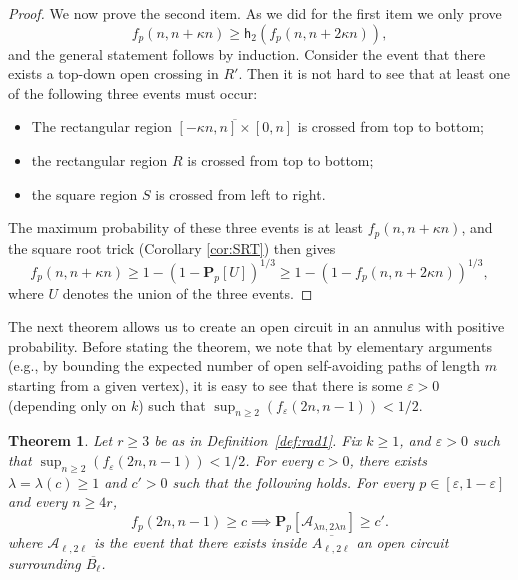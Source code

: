 \documentclass[12pt, twoside,a4paper,reqno]{amsart}
\theoremstyle{plain}
\newtheorem{theorem}{Theorem}[section]
\theoremstyle{remark}
\theoremstyle{definition}
\newcommand{\eps}{\varepsilon}
\newcommand{\PP}{\mathbf{P}}
\newcommand{\Pp}[1]{\PP_p \left [ #1 \right ]}
\newcommand{\ol}{\overline}
\begin{document}
\begin{proof}
We now prove the second item. As we did for the first item we only prove
\begin{equation}
  \label{eq:44}
  f_p(n,n +\kappa n)\geq \mathsf{h}_{2}(f_p(n,n+2\kappa n)),
\end{equation}
and the general statement follows by induction. Consider the event that
there exists a top-down open crossing in $R'$. Then it is not hard to see that at least one of the following three
events must occur:
\begin{itemize}
\item The rectangular region $\ol{[-\kappa n,n]\times[0,n]}$ is crossed from top to bottom;
\item the rectangular region $R$ is crossed from top to bottom;
\item the square region $S$ is crossed from left to right.
\end{itemize}
The maximum probability of these three events is at least $f_p(n,n+\kappa n)$,
and the square root trick (Corollary \ref{cor:SRT}) then gives
\begin{equation}
  \label{eq:45}
  f_p(n,n+\kappa n)\ge 1-(1-\Pp{U})^{1/3} \ge 1-(1-f_p(n,n+2\kappa n))^{1/3},
\end{equation}
where $U$ denotes the union of the three events.
\end{proof}

The next theorem allows us to create an open circuit in an annulus with positive
probability. Before stating the theorem, we note that by elementary arguments
(e.g., by bounding the expected number of open self-avoiding paths of length $m$
starting from a given vertex), it is easy to see that there is some $\eps>0$
(depending only on $k$) such that $\sup_{n\geq 2}(f_\eps(2n,n-1)) <1/2$.
\begin{theorem}
  \label{cor:GL}Let $r\ge 3$ be as in Definition~\ref{def:rad1}. Fix $k\ge1$,
  and $\eps>0$ such that $\sup_{n\ge 2}(f_\eps(2n,n-1))<1/2$. For every $c>0$,
  there exists $\lambda=\lambda(c)\ge1$ and $c'>0$ such that the following
  holds. For every $p\in[\eps,1-\eps]$ and every $n\ge 4r$,
  \begin{equation}
    \label{eq:26}
    f_p(2n,n-1)\ge c \implies \Pp{\mathcal A_{\lambda n,2\lambda n}} \ge c'.
  \end{equation}
  where $\mathcal A_{\ell,2\ell}$ is the event that there exists inside
  $\ol{A_{\ell,2\ell}}$ an open circuit surrounding $\ol{B_\ell}$.
\end{theorem}
\end{document}
